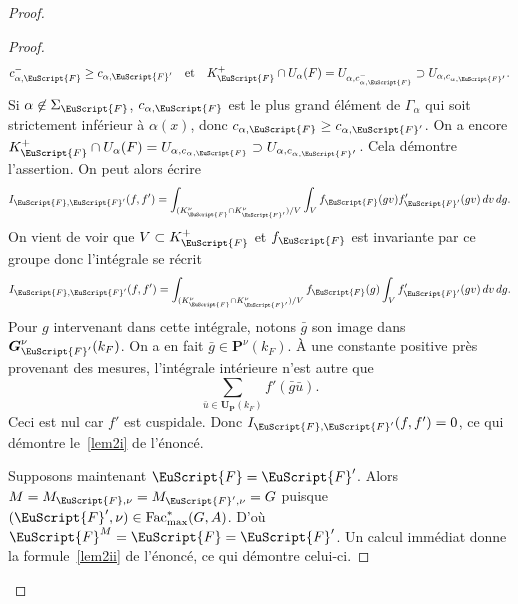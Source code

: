 \documentclass[JEP,XML,SOM,Unicode,francais]{cedram}
\let\mathcal \EuScript
\newcommand{\quadet}{\quad\text{et}\quad}
\newcommand{\Fac}{\mathrm{Fac}}
\newcommand{\bG}{\boldsymbol{G}}
\newcommand{\bP}{\boldsymbol{P}}
\newcommand{\bU}{\boldsymbol{U}}
\newcommand{\cF}{\mathcal{F}}
\theoremstyle{plain}
\theoremstyle{definition}
\begin{document}
\begin{proof}
\begin{proof}
\[
c_{\alpha,\cF}^-\geq c_{\alpha,\cF'}\quadet K_{\cF}^+\cap U_{\alpha}(F)=U_{\alpha,c_{\alpha,\cF}^-}\supset U_{\alpha,c_{\alpha,\cF'}}.
\]
Si $\alpha\not\in \Sigma_{\cF}$, $c_{\alpha,\cF}$ est le plus grand élément de $\Gamma_{\alpha}$ qui soit strictement inférieur à $\alpha(x)$, donc $c_{\alpha,\cF}\geq c_{\alpha,\cF'}$. On a encore $K_{\cF}^+\cap U_{\alpha}(F)=U_{\alpha,c_{\alpha,\cF}}\supset U_{\alpha,c_{\alpha,\cF'}}$. Cela démontre l'assertion. On peut alors écrire
\[
I_{\cF,\cF'}(f,f')=\int_{(K_{\cF}^{\nu}\cap K_{\cF'}^{\nu})/V}\int_{V}f_{\cF}(gv)f'_{\cF'}(gv)\, dv\, dg.
\]
On vient de voir que $V\subset K_{\cF}^+$ et $f_{\cF}$ est invariante par ce groupe donc l'intégrale se récrit
\[
I_{\cF,\cF'}(f,f')=\int_{(K_{\cF}^{\nu}\cap K_{\cF'}^{\nu})/V}f_{\cF}(g)\int_{V}f'_{\cF'}(gv)\, dv\, dg.
\]
Pour $g$ intervenant dans cette intégrale, notons $\bar{g}$ son image dans $\bG^{\nu}_{\cF'}(k_{F})$. On a en fait $\bar{g}\in \bP^{\nu}(k_{F})$. À une constante positive près provenant des mesures, l'intégrale intérieure n'est autre que
\[
\sum_{\bar{u}\in \bU_{\bP}(k_{F})}f'(\bar{g}\bar{ u}).
\]
Ceci est nul car $f'$ est cuspidale. Donc $I_{\cF,\cF'}(f,f')=0$, ce qui démontre le~\eqref{lem2i} de l'énoncé.

Supposons maintenant $\cF=\cF'$. Alors $M=M_{\cF,\nu}=M_{\cF',\nu}=G$ puisque $(\cF',\nu)\in \Fac^*_{\max}(G,A)$. D'où $\cF^M=\cF=\cF'$. Un calcul immédiat donne
la formule~\eqref{lem2ii} de l'énoncé, ce qui démontre celui-ci.
\end{proof}


\end{proof}
\end{document}
